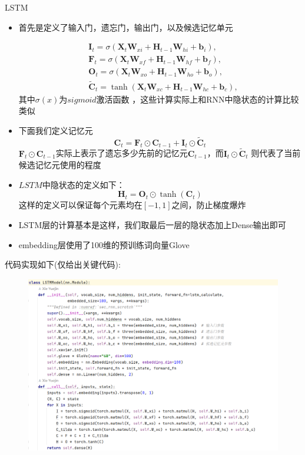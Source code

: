 \documentclass[UTF8]{ctexbeamer}
\begin{document}
\begin{frame}[allowframebreaks]{LSTM}
\begin{itemize}
	\item 首先是定义了输入门，遗忘门，输出门，以及候选记忆单元
	
	\begin{align*}
		&\mathbf{I}_{t} =\sigma(\mathbf{X}_t\mathbf{W}_{xi}+\mathbf{H}_{t-1}\mathbf{W}_{hi}+\mathbf{b}_i), \\
		&\mathbf{F}_{t} =\sigma(\mathbf{X}_t\mathbf{W}_{xf}+\mathbf{H}_{t-1}\mathbf{W}_{hf}+\mathbf{b}_f), \\
		&\mathbf{O}_{t} =\sigma(\mathbf{X}_t\mathbf{W}_{xo}+\mathbf{H}_{t-1}\mathbf{W}_{ho}+\mathbf{b}_o),\\
		&\tilde{\mathbf{C}}_t=\tanh(\mathbf{X}_t\mathbf{W}_{xc}+\mathbf{H}_{t-1}\mathbf{W}_{hc}+\mathbf{b}_c),
	\end{align*}
	其中$\sigma(x)$为$sigmoid$激活函数 ，这些计算实际上和RNN中隐状态的计算比较类似\\
	\item 下面我们定义记忆元
	$$
	\mathbf{C}_t=\mathbf{F}_t\odot\mathbf{C}_{t-1}+\mathbf{I}_t\odot\tilde{\mathbf{C}}_t
	$$
	$\mathbf{F}_t\odot\mathbf{C}_{t-1}$实际上表示了遗忘多少先前的记忆元$\mathbf{C}_{t-1}$，而$\mathbf{I}_t\odot\tilde{\mathbf{C}}_t$ 则代表了当前候选记忆元使用的程度
	\item $LSTM$中隐状态的定义如下：
	$$
	\mathbf{H}_t=\mathbf{O}_t\odot\tanh(\mathbf{C}_t)
	$$
	这样的定义可以保证每个元素均在$[-1,1]$之间，防止梯度爆炸
	\item LSTM层的计算基本是这样，我们取最后一层的隐状态加上Dense输出即可
	\item embedding层使用了100维的预训练词向量Glove
\end{itemize}\newpage
代码实现如下(仅给出关键代码):
\begin{figure}[H] %
	\centering %
	\includegraphics[scale=0.25]{LSTM2.png} %

\end{figure}
\end{frame}
\end{document}
